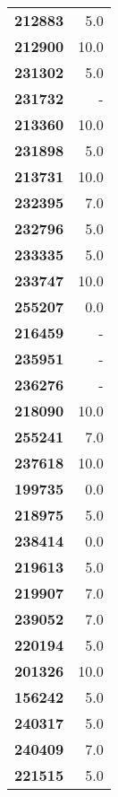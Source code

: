\documentclass[11pt]{article}
\begin{document}
\begin{center}
\begin{longtable}{lr}
\bottomrule
\endlastfoot
\textbf{212883} &                      5.0 \\
\textbf{212900} &                     10.0 \\
\textbf{231302} &                      5.0 \\
\textbf{231732} &                        - \\
\textbf{213360} &                     10.0 \\
\textbf{231898} &                      5.0 \\
\textbf{213731} &                     10.0 \\
\textbf{232395} &                      7.0 \\
\textbf{232796} &                      5.0 \\
\textbf{233335} &                      5.0 \\
\textbf{233747} &                     10.0 \\
\textbf{255207} &                      0.0 \\
\textbf{216459} &                        - \\
\textbf{235951} &                        - \\
\textbf{236276} &                        - \\
\textbf{218090} &                     10.0 \\
\textbf{255241} &                      7.0 \\
\textbf{237618} &                     10.0 \\
\textbf{199735} &                      0.0 \\
\textbf{218975} &                      5.0 \\
\textbf{238414} &                      0.0 \\
\textbf{219613} &                      5.0 \\
\textbf{219907} &                      7.0 \\
\textbf{239052} &                      7.0 \\
\textbf{220194} &                      5.0 \\
\textbf{201326} &                     10.0 \\
\textbf{156242} &                      5.0 \\
\textbf{240317} &                      5.0 \\
\textbf{240409} &                      7.0 \\
\textbf{221515} &                      5.0 \\

\end{longtable}
\end{center}
\end{document}
